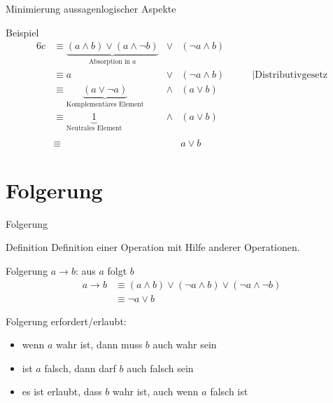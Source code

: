 \documentclass[xelatex,aspectratio=169]{beamer}
\begin{document}
\begin{frame}{Minimierung aussagenlogischer Aspekte}
  \begin{exampleblock}{Beispiel}
    \vspace{-\baselineskip}
    \begin{alignat*}{6}
      c & \equiv \underbrace{(a \land b) \lor  (a \land \lnot b)}_{\text{Absorption in }a}                   & \lor  & (\lnot a \land b)                                         \\
        & \equiv                               a                                                             & \lor  & (\lnot a \land b) & \qquad \vert \text{Distributivgesetz} \\
        & \equiv                               \underbrace{(a \lor \lnot a)}_{\text{Komplementäres Element}} & \land & (a \lor b)                                                \\
        & \equiv                               \underbrace{1}_{\text{Neutrales Element}}                     & \land & (a \lor b)                                                \\
      \\
        & \equiv                                                                                             &       & a \lor b
    \end{alignat*}
  \end{exampleblock}
\end{frame}

\section{Folgerung}

\begin{frame}{Folgerung}
  \begin{block}{Definition}
    Definition einer Operation mit Hilfe anderer Operationen.

    Folgerung \(a \rightarrow b\): aus \(a\) folgt \(b\)
    \begin{align*}
      a \rightarrow b & \equiv (a \land b) \lor (\lnot a \land b) \lor (\lnot a \land \lnot b) \\
                      & \equiv \lnot a \lor b
    \end{align*}
  \end{block}

  Folgerung erfordert/erlaubt:
  \begin{itemize}
    \item wenn \(a\) wahr ist, dann muss \(b\) auch wahr sein
    \item ist \(a\) falsch, dann darf \(b\) auch falsch sein
    \item es ist erlaubt, dass \(b\) wahr ist, auch wenn \(a\) falsch ist
  \end{itemize}

\end{frame}
\end{document}

